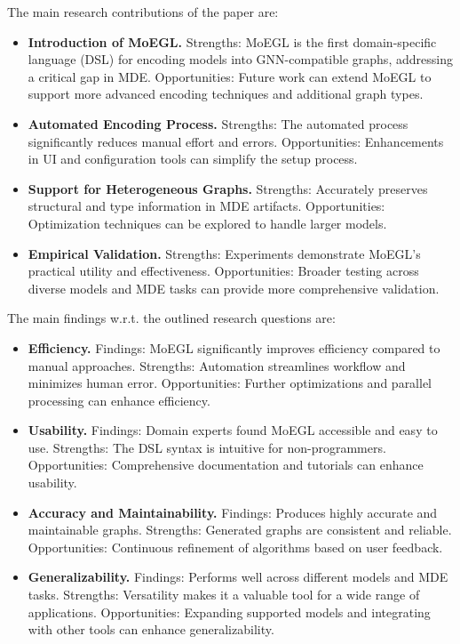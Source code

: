 \documentclass[journal,article,submit,moreauthors,technologies]{Definitions/mdpi}
\begin{document}
The main research contributions of the paper are:
\begin{itemize}
    \item \textbf{Introduction of MoEGL.} Strengths: MoEGL is the first domain-specific language (DSL) for encoding models into GNN-compatible graphs, addressing a critical gap in MDE. Opportunities: Future work can extend MoEGL to support more advanced encoding techniques and additional graph types.
    \item \textbf{Automated Encoding Process.} Strengths: The automated process significantly reduces manual effort and errors. Opportunities: Enhancements in UI and configuration tools can simplify the setup process.
    \item \textbf{Support for Heterogeneous Graphs.} Strengths: Accurately preserves structural and type information in MDE artifacts. Opportunities: Optimization techniques can be explored to handle larger models.
    \item \textbf{Empirical Validation.} Strengths: Experiments demonstrate MoEGL's practical utility and effectiveness. Opportunities: Broader testing across diverse models and MDE tasks can provide more comprehensive validation.
\end{itemize}

The main findings w.r.t. the outlined research questions are:
\begin{itemize}
    \item \textbf{Efficiency.} Findings: MoEGL significantly improves efficiency compared to manual approaches. Strengths: Automation streamlines workflow and minimizes human error. Opportunities: Further optimizations and parallel processing can enhance efficiency.
    \item \textbf{Usability.} Findings: Domain experts found MoEGL accessible and easy to use. Strengths: The DSL syntax is intuitive for non-programmers. Opportunities: Comprehensive documentation and tutorials can enhance usability.
    \item \textbf{Accuracy and Maintainability.} Findings: Produces highly accurate and maintainable graphs. Strengths: Generated graphs are consistent and reliable. Opportunities: Continuous refinement of algorithms based on user feedback.
    \item \textbf{Generalizability.} Findings: Performs well across different models and MDE tasks. Strengths: Versatility makes it a valuable tool for a wide range of applications. Opportunities: Expanding supported models and integrating with other tools can enhance generalizability.
\end{itemize}
\end{document}
